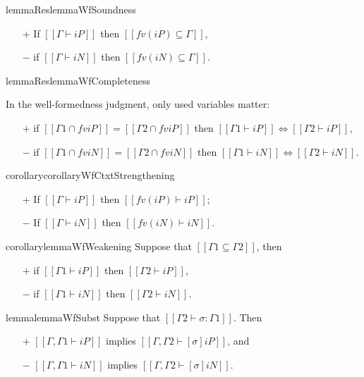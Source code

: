 \begin{restatable}{lemmaRes}{lemmaWfSoundness}
    \label{lemma:wf-soundness}
        \hfill
        \begin{itemize}
            \item[$+$] If $[[Γ ⊢ iP]]$ then $[[fv(iP) ⊆ Γ]]$,
            \item[$-$] if $[[Γ ⊢ iN]]$ then $[[fv(iN) ⊆ Γ]]$.
        \end{itemize}
\end{restatable}

\begin{restatable}{lemmaRes}{lemmaWfCompleteness}
    \label{lemma:wf-ctxt-equiv}

    In the well-formedness judgment, only used variables matter:
    \begin{itemize}
        \item[$+$] if $[[Γ1 ∩ fv iP]] = [[Γ2 ∩ fv iP]]$ then
        $[[Γ1 ⊢ iP]] \iff [[Γ2 ⊢ iP]]$,
        \item[$-$] if $[[Γ1 ∩ fv iN]] = [[Γ2 ∩ fv iN]]$ then
        $[[Γ1 ⊢ iN]] \iff [[Γ2 ⊢ iN]]$.
    \end{itemize}
\end{restatable}

\begin{restatable}{corollary}{corollaryWfCtxtStrengthening}
    \label{corollary:wf-ctxt-strengthening}
    \hfill
    
    \begin{itemize}
      \item [$+$] If $[[Γ ⊢ iP]]$ then $[[fv(iP) ⊢ iP]]$;
      \item [$-$] If $[[Γ ⊢ iN]]$ then $[[fv(iN) ⊢ iN]]$.
    \end{itemize}
\end{restatable}


 \begin{restatable}{corollary}{lemmaWfWeakening}
    \label{lemma:wf-weakening}
    Suppose that $[[Γ1 ⊆ Γ2]]$, then
    \begin{itemize}
      \item[$+$] if $[[Γ1 ⊢ iP]]$ then $[[Γ2 ⊢ iP]]$,
      \item[$-$] if $[[Γ1 ⊢ iN]]$ then $[[Γ2 ⊢ iN]]$.
    \end{itemize}
\end{restatable}

\begin{restatable}{lemma}{lemmaWfSubst}
    \label{lemma:wf-subst}
    Suppose that $[[Γ2 ⊢ σ : Γ1]]$. Then
    \begin{itemize}
    \item[$+$] $[[Γ, Γ1 ⊢ iP]]$ implies $[[Γ, Γ2 ⊢ [σ]iP]]$, and
    \item[$-$] $[[Γ, Γ1 ⊢ iN]]$ implies $[[Γ, Γ2 ⊢ [σ]iN]]$.
    \end{itemize}
\end{restatable}
